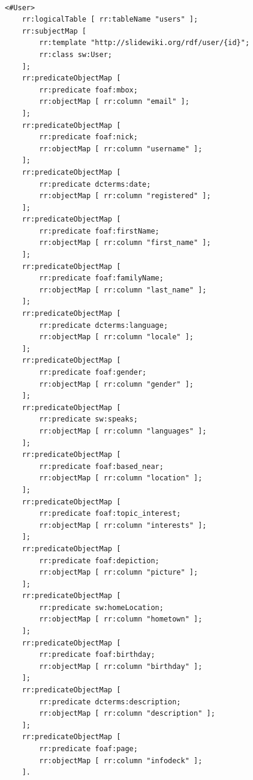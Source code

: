 \begin{lstlisting}
	
<#User>
	rr:logicalTable [ rr:tableName "users" ];
	rr:subjectMap [
		rr:template "http://slidewiki.org/rdf/user/{id}";
		rr:class sw:User;
	];
	rr:predicateObjectMap [
		rr:predicate foaf:mbox;
		rr:objectMap [ rr:column "email" ];
	];
	rr:predicateObjectMap [
		rr:predicate foaf:nick;
		rr:objectMap [ rr:column "username" ];
	];
	rr:predicateObjectMap [
		rr:predicate dcterms:date;
		rr:objectMap [ rr:column "registered" ];
	];
	rr:predicateObjectMap [
		rr:predicate foaf:firstName;
		rr:objectMap [ rr:column "first_name" ];
	];
	rr:predicateObjectMap [
		rr:predicate foaf:familyName;
		rr:objectMap [ rr:column "last_name" ];
	];
	rr:predicateObjectMap [
		rr:predicate dcterms:language;
		rr:objectMap [ rr:column "locale" ];
	];
	rr:predicateObjectMap [
		rr:predicate foaf:gender;
		rr:objectMap [ rr:column "gender" ];
	];
	rr:predicateObjectMap [
		rr:predicate sw:speaks;
		rr:objectMap [ rr:column "languages" ];
	];
	rr:predicateObjectMap [
		rr:predicate foaf:based_near;
		rr:objectMap [ rr:column "location" ];
	];
	rr:predicateObjectMap [
		rr:predicate foaf:topic_interest;
		rr:objectMap [ rr:column "interests" ];
	];
	rr:predicateObjectMap [
		rr:predicate foaf:depiction;
		rr:objectMap [ rr:column "picture" ];
	];
	rr:predicateObjectMap [
		rr:predicate sw:homeLocation;
		rr:objectMap [ rr:column "hometown" ];
	];
	rr:predicateObjectMap [
		rr:predicate foaf:birthday;
		rr:objectMap [ rr:column "birthday" ];
	];
	rr:predicateObjectMap [
		rr:predicate dcterms:description;
		rr:objectMap [ rr:column "description" ];
	];
	rr:predicateObjectMap [
		rr:predicate foaf:page;
		rr:objectMap [ rr:column "infodeck" ];
	].
    
\end{lstlisting}

%
%
%


